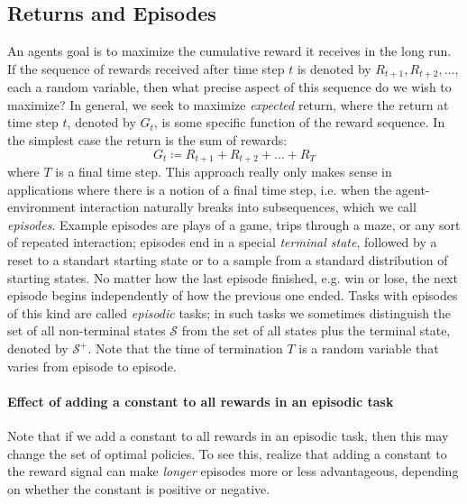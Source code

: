\documentclass[12pt]{article}
\begin{document}
\subsection{Returns and Episodes} An agents goal is to maximize the cumulative reward it receives in the long run. If the sequence of rewards received after time step $t$ is denoted by $R_{t+1}, R_{t+2}, \ldots$, each a random variable, then what precise aspect of this sequence do we wish to maximize? In general, we seek to maximize \emph{expected} return, where the return at time step $t$, denoted by $G_t$,
is some specific function of the reward sequence. In the simplest case the return is the sum of rewards:
\begin{equation}
  \label{eq: sumofrewards}
  G_t \coloneqq R_{t+1} + R_{t+2} + \ldots + R_T
\end{equation}
where $T$ is a final time step. This approach really only makes sense in applications where there is a notion of a final time step, i.e. when the agent-environment interaction naturally breaks into subsequences, which we call \emph{episodes}. Example episodes are plays of a game, trips through a maze, or any sort of repeated interaction; episodes end in a special \emph{terminal state}, followed by a reset to a standart starting state or to a sample from a standard distribution of starting states. No matter how the last episode finished, e.g. win or lose, the next episode begins independently of how the previous one ended.  Tasks with episodes of this kind are called \emph{episodic} tasks; in such tasks we sometimes distinguish the set of all non-terminal states $\mathcal S$ from the set of all states plus the terminal state, denoted by $\mathcal S^+$. Note that the time of termination $T$ is a random variable that varies from episode to episode.

\paragraph{Effect of adding a constant to all rewards in an episodic task}
Note that if we add a constant to all rewards in an episodic task, then this may change the set of optimal policies. To see this, realize that adding a constant to the reward signal can make \emph{longer} episodes more or less advantageous, depending on whether the constant is positive or negative.
\end{document}
